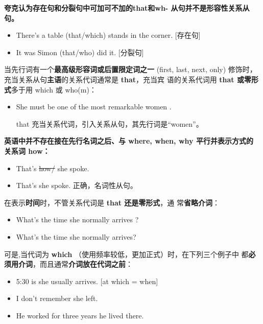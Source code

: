 \textbf{夸克认为存在句和分裂句中可加可不加的that和wh- 从句并不是形容性关系从
  句。}
\begin{itemize}
\item There's a table (that/which) stands in the corner. [存在句]

\item It was Simon (that/who) did it. [分裂句]
\end{itemize}

当先行词有一个\textbf{最高级形容词或后置限定词之一} (first, last, next,
only) 修饰时，充当关系从句\textbf{主语}的关系代词通常是 \textbf{that}，充当宾
语的关系代词用 \textbf{that 或零形式}多于用 which 或 who(m)：
\begin{itemize}
\item She must be one of the most remarkable women .

  that 充当关系代词，引入关系从句，其先行词是“women”。
\end{itemize}

\textbf{英语中并不存在接在先行名词之后、与 where, when, why 平行并表示方式的
  关系词 how：}
\begin{itemize}

\item That's  \sout{how/} she spoke.

\item That's  she spoke. 正确，名词性从句。
\end{itemize}

在表示\textbf{时间}时，不管关系代词是 \textbf{that 还是零形式}，通
常\textbf{省略介词}：
\begin{itemize}
\item What's the time  she normally arrives ?
\item What's the time  she normally arrives?
\end{itemize}

可是,当代词为 \textbf{which} （使用频率较低，更加正式）时，在下列三个例子中
都\textbf{必须用介词}，而且通常\textbf{介词放在代词之前}：
\begin{itemize}
\item 5:30 is  she usually arrives. [at which =
  when]
\item I don't remember  she left.

\item He worked for three years  he lived there.
\end{itemize}


